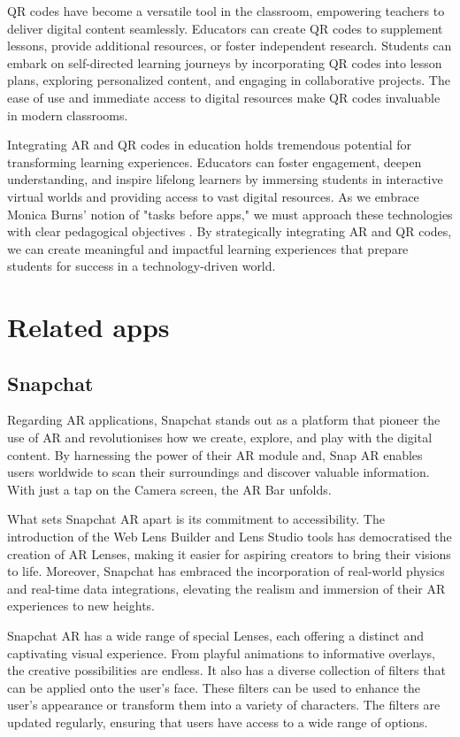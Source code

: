 \ac{QR} codes have become a versatile tool in the classroom, empowering teachers to deliver digital content seamlessly. Educators can create \ac{QR} codes to supplement lessons, provide additional resources, or foster independent research. Students can embark on self-directed learning journeys by incorporating \ac{QR} codes into lesson plans, exploring personalized content, and engaging in collaborative projects. The ease of use and immediate access to digital resources make \ac{QR} codes invaluable in modern classrooms.

Integrating \ac{AR} and \ac{QR} codes in education holds tremendous potential for transforming learning experiences. Educators can foster engagement, deepen understanding, and inspire lifelong learners by immersing students in interactive virtual worlds and providing access to vast digital resources. As we embrace Monica Burns' notion of "tasks before apps," we must approach these technologies with clear pedagogical objectives \cite{Burns2016}. By strategically integrating \ac{AR} and \ac{QR} codes, we can create meaningful and impactful learning experiences that prepare students for success in a technology-driven world.


\section{Related apps}
\subsection*{Snapchat}
Regarding \ac{AR} applications, Snapchat \cite{Snapchat} stands out as a platform that pioneer the use of \ac{AR} and revolutionises how we create, explore, and play with the digital content. By harnessing the power of their \ac{AR} module and, Snap \ac{AR} \cite{SnapAR} enables users worldwide to scan their surroundings and discover valuable information. With just a tap on the Camera screen, the \ac{AR} Bar unfolds.

What sets Snapchat \ac{AR} apart is its commitment to accessibility. The introduction of the Web Lens Builder and Lens Studio tools has democratised the creation of \ac{AR} Lenses, making it easier for aspiring creators to bring their visions to life. Moreover, Snapchat has embraced the incorporation of real-world physics and real-time data integrations, elevating the realism and immersion of their \ac{AR} experiences to new heights.

Snapchat \ac{AR} has a wide range of special Lenses, each offering a distinct and captivating visual experience. From playful animations to informative overlays, the creative possibilities are endless. It also has a diverse collection of filters that can be applied onto the user's face. These filters can be used to enhance the user's appearance or transform them into a variety of characters. The filters are updated regularly, ensuring that users have access to a wide range of options.

